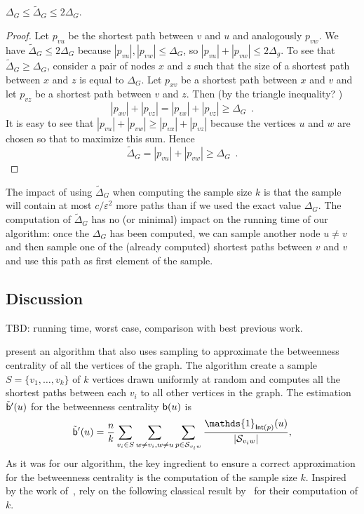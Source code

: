 \begin{lemma}\label{lem:diam}
  $\Delta_G\le\tilde\Delta_G\le 2\Delta_G$.
\end{lemma}
\begin{proof}
  Let $p_{vu}$ be the shortest path between $v$ and $u$ and analogously
  $p_{vw}$. We have $\tilde\Delta_G\le 2\Delta_G$ because
  $|p_{vu}|,|p_{vw}|\le\Delta_G$, so $|p_{vu}|+|p_{vw}|\le 2\Delta_g$. To see
  that $\tilde\Delta_G\ge\Delta_G$, consider a pair of nodes $x$ and $z$ such
  that the size of a shortest path between $x$ and $z$ is equal to $\Delta_G$.
  Let $p_{xv}$ be a shortest path between $x$ and $v$ and let $p_{vz}$ be a
  shortest path between $v$ and $z$. 
  Then (by the triangle inequality? \XXX)
  \[
  |p_{xv}|+|p_{vz}|=|p_{vx}|+|p_{vz}|\ge\Delta_G\enspace.
  \]
  It is easy to see that $|p_{vu}|+|p_{vw}|\ge|p_{vx}|+|p_{vz}|$ because the
  vertices $u$ and $w$ are chosen so that to maximize this sum. Hence
  \[
  \tilde\Delta_G = |p_{vu}|+|p_{vw}| \ge\Delta_G\enspace.%
  \]
\end{proof}

The impact of using $\tilde\Delta_G$ when computing the sample size $k$ is that
the sample will contain at most $c/\varepsilon^2$ more paths than if we used the
exact value $\Delta_G$. The computation of $\tilde\Delta_G$ has no (\XXX or
minimal) impact on the running time of our algorithm: once the $\Delta_G$ has
been computed, we can sample another node $u\neq v$ and then sample one of the
(already computed) shortest paths between $v$ and $v$ and use this path as first
element of the sample.

\subsection{Discussion}\label{sec:discussion}
\XXX TBD: running time, worst case, comparison with best previous work.

\citet{BrandesP07} present an algorithm that also uses sampling to approximate
the betweenness centrality of all the vertices of the graph. The algorithm
create a sample $S=\{v_1,\dotsc,v_k\}$ of $k$ vertices drawn uniformly at random 
and computes all the shortest paths between each $v_i$ to all other vertices in
the graph. The estimation $\tilde{\mathsf{b}}'(u)$ for the betweenness centrality
$\mathsf{b}(u)$ is
\[ 
\tilde\betw'(u)= \frac{n}{k}\sum_{v_i\in S}\sum_{w\neq v_i,w\neq
u}\sum_{p\in\mathcal{S}_{v_iw}}\frac{\mathds{1}_{\mathsf{Int}(p)}(u)}{|\mathcal{S}_{v_iw}|},
\]
As it was for our algorithm, the key ingredient to ensure a correct
approximation for the betweenness centrality is the computation of the sample
size $k$. Inspired by the work of~\citet{EppsteinW04}, \citet{BrandesP07} rely
on the following classical result by~\citet{Hoeffding63} for their computation
of $k$.

